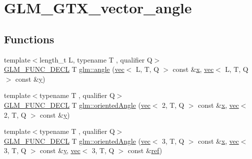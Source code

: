 \hypertarget{group__gtx__vector__angle}{}\section{G\+L\+M\+\_\+\+G\+T\+X\+\_\+vector\+\_\+angle}
\label{group__gtx__vector__angle}
\subsection*{Functions}
\begin{DoxyCompactItemize}
\item 
{\footnotesize template$<$length\+\_\+t L, typename T , qualifier Q$>$ }\\\hyperlink{setup_8hpp_ab2d052de21a70539923e9bcbf6e83a51}{G\+L\+M\+\_\+\+F\+U\+N\+C\+\_\+\+D\+E\+CL} T \hyperlink{group__gtx__vector__angle_ga2e2917b4cb75ca3d043ac15ff88f14e1}{glm\+::angle} (\hyperlink{structglm_1_1vec}{vec}$<$ L, T, Q $>$ const \&\hyperlink{_s_d_l__opengl_8h_ad0e63d0edcdbd3d79554076bf309fd47}{x}, \hyperlink{structglm_1_1vec}{vec}$<$ L, T, Q $>$ const \&\hyperlink{_s_d_l__opengl_8h_a1675d9d7bb68e1657ff028643b4037e3}{y})
\item 
{\footnotesize template$<$typename T , qualifier Q$>$ }\\\hyperlink{setup_8hpp_ab2d052de21a70539923e9bcbf6e83a51}{G\+L\+M\+\_\+\+F\+U\+N\+C\+\_\+\+D\+E\+CL} T \hyperlink{group__gtx__vector__angle_ga9556a803dce87fe0f42fdabe4ebba1d5}{glm\+::oriented\+Angle} (\hyperlink{structglm_1_1vec}{vec}$<$ 2, T, Q $>$ const \&\hyperlink{_s_d_l__opengl_8h_ad0e63d0edcdbd3d79554076bf309fd47}{x}, \hyperlink{structglm_1_1vec}{vec}$<$ 2, T, Q $>$ const \&\hyperlink{_s_d_l__opengl_8h_a1675d9d7bb68e1657ff028643b4037e3}{y})
\item 
{\footnotesize template$<$typename T , qualifier Q$>$ }\\\hyperlink{setup_8hpp_ab2d052de21a70539923e9bcbf6e83a51}{G\+L\+M\+\_\+\+F\+U\+N\+C\+\_\+\+D\+E\+CL} T \hyperlink{group__gtx__vector__angle_ga706fce3d111f485839756a64f5a48553}{glm\+::oriented\+Angle} (\hyperlink{structglm_1_1vec}{vec}$<$ 3, T, Q $>$ const \&\hyperlink{_s_d_l__opengl_8h_ad0e63d0edcdbd3d79554076bf309fd47}{x}, \hyperlink{structglm_1_1vec}{vec}$<$ 3, T, Q $>$ const \&\hyperlink{_s_d_l__opengl_8h_a1675d9d7bb68e1657ff028643b4037e3}{y}, \hyperlink{structglm_1_1vec}{vec}$<$ 3, T, Q $>$ const \&\hyperlink{_s_d_l__opengl__glext_8h_ad32bdec748ba376f6c0d2df39ab9a95b}{ref})
\end{DoxyCompactItemize}


